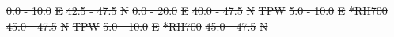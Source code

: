 \documentclass[review]{elsarticle}
\providecommand{\DIFdeltex}[1]{{\protect\color{red}\sout{#1}}}                      %
\providecommand{\DIFdelFL}[1]{\DIFdel{#1}} %
\providecommand{\DIFdel}[1]{\texorpdfstring{\DIFdeltex{#1}}{}} %
\begin{document}
\begin{table}[t]
\begin{center}
			\DIFdelFL{0.0 - 10.0 }%
			\DIFdelFL{E }%
			\DIFdelFL{42.5 - 47.5 }%
			\DIFdelFL{N }%
			\DIFdelFL{0.0 - 20.0 }%
			\DIFdelFL{E }%
			\DIFdelFL{40.0 - 47.5 }%
			\DIFdelFL{N }%
			\DIFdelFL{TPW }%
			\DIFdelFL{5.0 - 10.0 }%
			\DIFdelFL{E }%
			\DIFdelFL{*RH700 }%
			\DIFdelFL{45.0 - 47.5 }%
			\DIFdelFL{N }%
			\DIFdelFL{TPW }%
			\DIFdelFL{5.0 - 10.0 }%
			\DIFdelFL{E }%
			\DIFdelFL{*RH700 }%
			\DIFdelFL{45.0 - 47.5 }%
			\DIFdelFL{N }%
			

\end{center}
\end{table}
\end{document}
